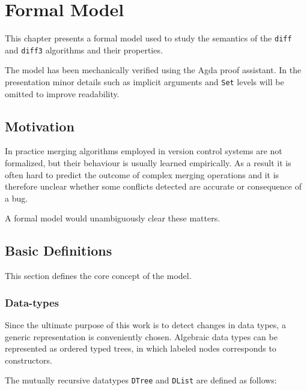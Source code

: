 \documentclass[../Thesis.tex]{subfiles}
\begin{document}
\chapter{Formal Model}
This chapter presents a formal model used to study the semantics of the \texttt{diff} and \texttt{diff3} algorithms and their properties.

The model has been mechanically verified using the Agda proof assistant.
In the presentation minor details such as implicit arguments and \texttt{Set} levels will be omitted to improve readability.

\section{Motivation}
In practice merging algorithms employed in version control systems 
are not formalized, but their behaviour is usually learned empirically.
As a result it is often hard to predict the outcome of complex merging operations and it is therefore unclear whether some conflicts detected are accurate or consequence of a bug. 


A formal model would unambiguously clear these matters.

\section{Basic Definitions}
This section defines the core concept of the model.

	\subsection{Data-types}
		Since the ultimate purpose of this work is to detect changes in 
		data types, a generic representation is conveniently chosen.
		Algebraic data types can be represented as ordered typed trees, in which 
		labeled nodes corresponds to constructors.

		The mutually recursive datatypes \texttt{DTree} and \texttt{DList} are
		defined as follows: 		
		\begin{prooftree}
		\end{prooftree}
	
\end{document}
